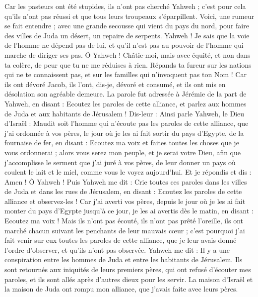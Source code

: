 \begin{multicols}{2}
Car les pasteurs ont été stupides, ils n'ont pas cherché Yahweh ; c'est pour cela qu'ils n'ont pas réussi et que tous leurs troupeaux s'éparpillent.
Voici, une rumeur se fait entendre ; avec une grande secousse qui vient du pays du nord, pour faire des villes de Juda un désert, un repaire de serpents.
Yahweh ! Je sais que la voie de l'homme ne dépend pas de lui, et qu'il n'est pas au pouvoir de l'homme qui marche de diriger ses pas.
Ô Yahweh ! Châtie-moi, mais avec équité, et non dans ta colère, de peur que tu ne me réduises à rien.
Répands ta fureur sur les nations qui ne te connaissent pas, et sur les familles qui n'invoquent pas ton Nom ! Car ils ont dévoré Jacob, ils l'ont, dis-je, dévoré et consumé, et ils ont mis en désolation son agréable demeure.
\VerseOne{}La parole fut adressée à Jérémie de la part de Yahweh, en disant :
Ecoutez les paroles de cette alliance, et parlez aux hommes de Juda et aux habitants de Jérusalem !
Dis-leur : Ainsi parle Yahweh, le Dieu d'Israël : Maudit soit l'homme qui n'écoute pas les paroles de cette alliance,
que j'ai ordonnée à vos pères, le jour où je les ai fait sortir du pays d'Egypte, de la fournaise de fer, en disant : Ecoutez ma voix et faites toutes les choses que je vous ordonnerai ; alors vous serez mon peuple, et je serai votre Dieu,
afin que j'accomplisse le serment que j'ai juré à vos pères, de leur donner un pays où coulent le lait et le miel, comme vous le voyez aujourd'hui. Et je répondis et dis : Amen ! Ô Yahweh !
Puis Yahweh me dit : Crie toutes ces paroles dans les villes de Juda et dans les rues de Jérusalem, en disant : Ecoutez les paroles de cette alliance et observez-les !
Car j'ai averti vos pères, depuis le jour où je les ai fait monter du pays d'Egypte jusqu'à ce jour, je les ai avertis dès le matin, en disant : Ecoutez ma voix !
Mais ils n'ont pas écouté, ils n'ont pas prêté l'oreille, ils ont marché chacun suivant les penchants de leur mauvais cœur ; c'est pourquoi j'ai fait venir sur eux toutes les paroles de cette alliance, que je leur avais donné l'ordre d'observer, et qu'ils n'ont pas observée.
Yahweh me dit : Il y a une conspiration entre les hommes de Juda et entre les habitants de Jérusalem.
Ils sont retournés aux iniquités de leurs premiers pères, qui ont refusé d'écouter mes paroles, et ils sont allés après d'autres dieux pour les servir. La maison d'Israël et la maison de Juda ont rompu mon alliance, que j'avais faite avec leurs pères.

\end{multicols}
